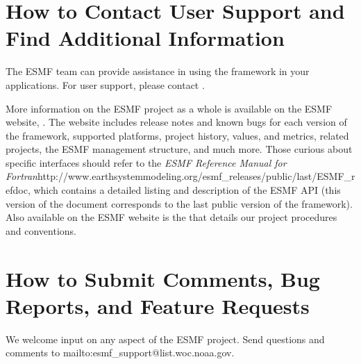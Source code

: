 \section{How to Contact User Support and Find Additional Information}
\label{sec:Support}
The ESMF team can provide assistance in using the framework in your
applications.
For user support, please contact 
.  

More information on the ESMF project as a whole is available on the 
ESMF website, .  
The website includes release notes and known bugs for each version of the
framework, supported platforms, project history, values, and metrics, related projects,
the ESMF management structure, and much more.  Those curious about specific 
interfaces should refer to the \htmladdnormallink
{{\it ESMF Reference Manual for Fortran}}{http://www.earthsystemmodeling.org/esmf_releases/public/last/ESMF_refdoc}, which contains a detailed listing and description of 
the ESMF API (this version of the document corresponds to the last public version of the framework).  Also available on the ESMF website is the
that details our project procedures and conventions.

\section{How to Submit Comments, Bug Reports, and Feature Requests}
\label{sec:Submission}
We welcome input on any aspect of the ESMF project.  Send
questions and comments to 
{mailto:esmf_support@list.woc.noaa.gov}.


